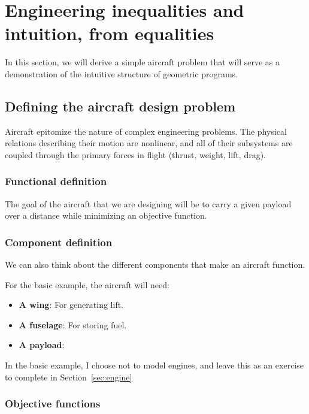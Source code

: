 \chapter{Engineering inequalities and intuition, from equalities}

In this section, we will derive a simple aircraft problem that will serve as a demonstration of the intuitive structure of geometric programs. 

\section{Defining the aircraft design problem}

Aircraft epitomize the nature of complex engineering problems. The physical 
relations describing their motion are nonlinear, and all of their subsystems are 
coupled through the primary forces in flight (thrust, weight, lift, drag). 

\subsection{Functional definition}

The goal of the aircraft that we are designing will be to carry a given payload
over a distance while minimizing an objective function. 

\subsection{Component definition}

We can also think about the different components that make an aircraft function. 

For the basic example, the aircraft will need:
\begin{itemize}
	\item \textbf{A wing}: For generating lift. 
	\item \textbf{A fuselage}: For storing fuel. 
	\item \textbf{A payload}:
\end{itemize}

In the basic example, I choose not to model engines, and leave this as an exercise
to complete in Section~\ref{sec:engine}

\subsection{}

\subsection{Objective functions}

